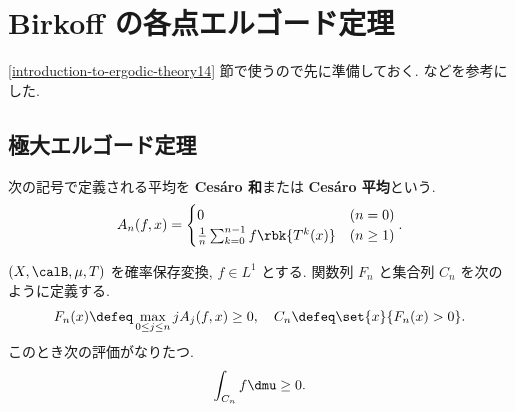 \documentclass[openany, a4paper, oneside]{jsbook}
\begin{document}
\section{Birkoff の各点エルゴード定理\label{introduction-to-ergodic-theory23}}

\ref{introduction-to-ergodic-theory14} 節で使うので先に準備しておく.
\cite{JamesPinkerton1, CharlesWalkden2} などを参考にした.
\subsection{極大エルゴード定理}

\begin{defn}
 次の記号で定義される平均を \textbf{Ces\'aro 和}または \textbf{Ces\'aro 平均}という.
 \begin{align}
  A_n (f, x)
  =
  \begin{cases}
   0 & (n=0) \\
   \frac{1}{n} \sum_{k=0}^{n-1} f \rbk{T^k (x)} & (n \geq 1)
  \end{cases}.
 \end{align}
\end{defn}
\begin{thm}\label{introduction-to-ergodic-theory2}
$(X, \calB, \mu, T)$ を確率保存変換, $f \in L^1$ とする.
関数列 $F_n$ と集合列 $C_n$ を次のように定義する.
\begin{align}
 F_n(x)
 \defeq
 \max_{0 \leq j \leq n} j A_j(f, x)
 \geq 0, \quad
 C_n
 \defeq
 \set{x}{F_n (x) > 0}.
\end{align}
このとき次の評価がなりたつ.
\begin{align}
 \int_{C_n} f \dmu \geq 0.
\end{align}
\end{thm}
\end{document}
